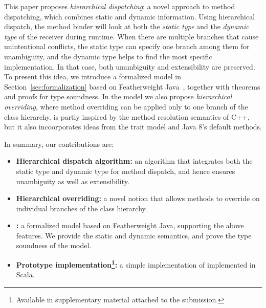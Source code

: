 This paper proposes \textit{hierarchical dispatching}: a novel approach
to method dispatching, which combines static and dynamic
information. Using hierarchical dispatch, the method binder will look
at both the \emph{static type} and the \emph{dynamic type} of the
receiver during runtime. When there are multiple branches that cause
unintentional conflicts, the static type can specify one branch among
them for unambiguity, and the dynamic type helps to find the most
specific implementation. In that case, both unambiguity and
extensibility are preserved. To present this idea, we introduce a
formalized model \MIM{} in Section~\ref{sec:formalization} based on
Featherweight Java~\cite{Igarashi01FJ}, together with theorems and
proofs for type soundness. In the model we also propose
\textit{hierarchical overriding}, where method overriding can be applied
only to one branch of the class hierarchy. 
\name{} is partly inspired by the method resolution semantics
of C++, but it also incoorporates ideas from the trait model and Java
8's default methods.


In summary, our contributions are:
\begin{itemize}
	\item \textbf{Hierarchical dispatch algorithm:} an algorithm that integrates both the static type and dynamic type for method dispatch, and hence
	ensures unambiguity as well as extensibility.
	\item \textbf{Hierarchical overriding:} a novel notion that allows
          methods to override on individual branches of the class hierarchy.
	\item \textbf{\name:} a formalized model based on
          Featherweight Java, supporting the above features. 
          We provide the static and dynamic semantics, and prove the
          type soundness of the model.
	\item \textbf{Prototype implementation\footnote{Available in
              supplementary material attached to the submission.}:} a
          simple implementation of \MIM{} implemented in Scala.
\end{itemize}

 